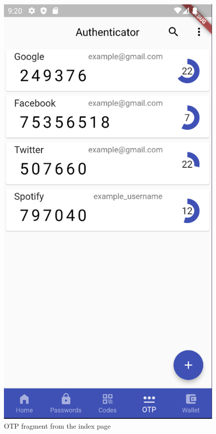 \documentclass[a4paper,12pt]{report}
\begin{document}
\begin{figure}[H]
    \centering
    \includegraphics[scale=0.43]{images/app/tokens.png}
    \caption{OTP fragment from the index page}\label{fig:otp}
\end{figure}
\end{document}
